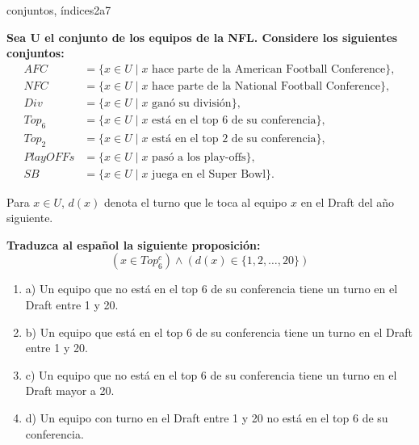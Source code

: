 \documentclass{article}
\begin{document}
\begin{question}{22}{conjuntos, índices}{2}{a}{7}{
\textbf{Sea U el conjunto de los equipos de la NFL. Considere los siguientes conjuntos:}
\[
\begin{aligned}
AFC &= \{ x \in U \mid x \text{ hace parte de la American Football Conference}\},\\
NFC &= \{ x \in U \mid x \text{ hace parte de la National Football Conference}\},\\
Div &= \{ x \in U \mid x \text{ ganó su división}\},\\
Top_6 &= \{ x \in U \mid x \text{ está en el top 6 de su conferencia}\},\\
Top_2 &= \{ x \in U \mid x \text{ está en el top 2 de su conferencia}\},\\
PlayOFFs &= \{ x \in U \mid x \text{ pasó a los play-offs}\},\\
SB &= \{ x \in U \mid x \text{ juega en el Super Bowl}\}.
\end{aligned}
\]

Para $x \in U$, $d(x)$ denota el turno que le toca al equipo $x$ en el Draft del año siguiente. \medskip

\textbf{Traduzca al español la siguiente proposición:}
\[
(x \in Top_6^c)\land(d(x) \in \{1,2,\dots,20\})
\]

\begin{enumerate}
    \item a) Un equipo que no está en el top 6 de su conferencia tiene un turno en el Draft entre 1 y 20.  
    \item b) Un equipo que está en el top 6 de su conferencia tiene un turno en el Draft entre 1 y 20.  
    \item c) Un equipo que no está en el top 6 de su conferencia tiene un turno en el Draft mayor a 20.  
    \item d) Un equipo con turno en el Draft entre 1 y 20 no está en el top 6 de su conferencia.  
\end{enumerate}
}
\end{question}
\end{document}
